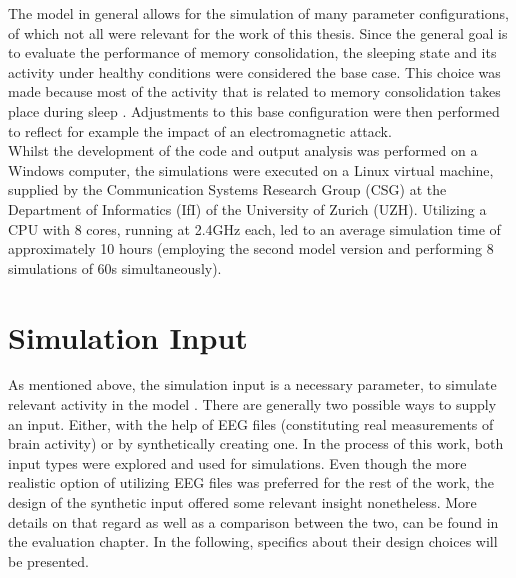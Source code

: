     The model in general allows for the simulation of many parameter configurations, of which not all were relevant for the work of this thesis. Since the general goal is to evaluate the performance of memory consolidation, the sleeping state and its activity under healthy conditions were considered the base case. This choice was made because most of the activity that is related to memory consolidation takes place during sleep \cite{BUZSAKI1989551}. Adjustments to this base configuration were then performed to reflect for example the impact of an electromagnetic attack.\\
    Whilst the development of the code and output analysis was performed on a Windows computer, the simulations were executed on a Linux virtual machine, supplied by the Communication Systems Research Group (CSG) at the Department of Informatics (IfI) of the University of Zurich (UZH). Utilizing a CPU with 8 cores, running at 2.4GHz each, led to an average simulation time of approximately 10 hours (employing the second model version and performing 8 simulations of 60s simultaneously). 

\section{Simulation Input}
As mentioned above, the simulation input is a necessary parameter, to simulate relevant activity in the model \cite{Aussel.2021}. There are generally two possible ways to supply an input. Either, with the help of EEG files (constituting real measurements of brain activity) or by synthetically creating one. In the process of this work, both input types were explored and used for simulations. Even though the more realistic option of utilizing EEG files was preferred for the rest of the work, the design of the synthetic input offered some relevant insight nonetheless. More details on that regard as well as a comparison between the two, can be found in the evaluation chapter. In the following, specifics about their design choices will be presented. 

